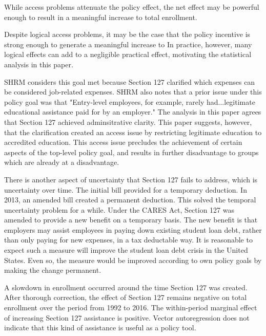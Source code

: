 \documentclass[review]{elsarticle}
\begin{document}
While access problems attenuate the policy effect,
the net effect may be powerful enough to result in a meaningful increase to total enrollment.

Despite logical access problems,
it may be the case that the policy incentive is strong enough to generate a meaningful increase to
In practice, however, many logical effects can add to a negligible practical effect,
motivating the statistical analysis in this paper.


SHRM considers this goal met because Section 127 clarified which expenses can be considered job-related expenses.
SHRM also notes that a prior issue under this policy goal was that
"Entry-level employees, for example, rarely had...legitimate educational assistance paid for by an employer."
The analysis in this paper agrees that Section 127 achieved adminsitrative clarity.
This paper suggests, however, that the clarification created an access issue by restricting legitimate education to accredited education.
This access issue precludes the achievement of certain aspects of the top-level policy goal,
and results in further disadvantage to groups which are already at a disadvantage.

There is another aspect of uncertainty that Section 127 fails to address, which is uncertainty over time.
The initial bill provided for a temporary deduction.
In 2013, an amended bill created a permanent deduction\cite{baldwin_2013}.
This solved the temporal uncertainty problem for a while.
Under the CARES Act, Section 127 was amended to provide a new benefit on a temporary basis\cite{schiavo_2020}.
The new benefit is that employers may assist employees in paying down existing student loan debt,
rather than only paying for new expenses, in a tax deductable way.
It is reasonable to expect such a measure will improve the student loan debt crisis in the United States.
Even so, the measure would be improved according to own policy goals by making the change permanent.


A slowdown in enrollment occurred around the time Section 127 was created.
After thorough correction, the effect of Section 127 remains negative on total enrollment over the period from 1992 to 2016.
The within-period marginal effect of increasing Section 127 assistance is positive.
Vector autoregression does not indicate that this kind of assistance is useful as a policy tool.
\end{document}

